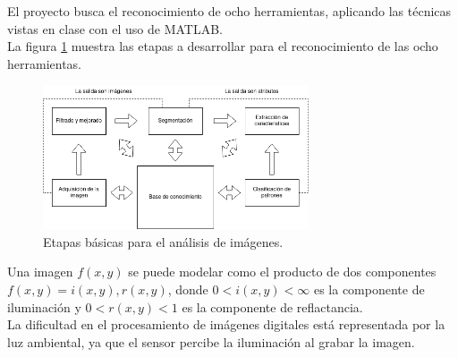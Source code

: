 \documentclass[a4paper, 11pt]{article}
\begin{document}
El proyecto busca el reconocimiento de ocho herramientas, aplicando las técnicas vistas en clase con el uso de MATLAB.\\

La figura \ref{etapas_basicas} muestra las etapas a desarrollar para el reconocimiento de las ocho herramientas.\\

\begin{figure}[h]
\centering
\includegraphics[width=0.7\textwidth]{etapas_basicas}
\caption{Etapas básicas para el análisis de imágenes.}
\label{etapas_basicas}
\end{figure}

Una imagen $f(x,y)$ se puede modelar como el producto de dos componentes $f(x,y) = i(x,y),r(x,y)$, donde $0<i(x,y)<\infty$ es la componente de iluminación y $0<r(x,y)<1$ es la componente de reflactancia.\\

La dificultad en el procesamiento de imágenes digitales está representada por la luz ambiental, ya que el sensor percibe la iluminación al grabar la imagen.\\



\end{document}
